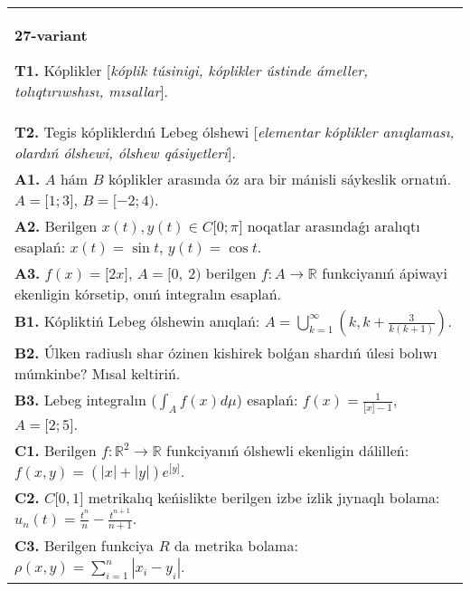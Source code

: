 \documentclass{article}
\begin{document}
\begin{tabular}{m{17cm}}
\textbf{27-variant}
\newline

\textbf{T1.} Kóplikler [\textit{kóplik túsinigi, kóplikler ústinde ámeller, tolıqtırıwshısı, mısallar}]. \\
\textbf{T2.} Tegis kópliklerdıń Lebeg ólshewi [\textit{elementar kóplikler anıqlaması, olardıń ólshewi, ólshew qásiyetleri}]. \\
\textbf{A1.} \(A\) hám \(B\) kóplikler arasında óz ara bir mánisli sáykeslik ornatıń. \(A = \lbrack 1;3\rbrack\), \(B = \lbrack - 2;4)\). \\
\textbf{A2.} Berilgen \(x(t),y(t) \in C\lbrack 0;\pi\rbrack\) noqatlar arasındaǵı aralıqtı esaplań: \(x(t) = \sin t\), \(y(t) = \cos t\). \\
\textbf{A3.} \(f(x) = \lbrack 2x\rbrack\), \(A = \lbrack 0,\ 2)\) berilgen \(f:A\rightarrow\mathbb{R}\) funkciyanıń ápiwayi ekenligin kórsetip, onıń integralın esaplań. \\
\textbf{B1.} Kópliktiń Lebeg ólshewin anıqlań: \(A = \bigcup_{k = 1}^{\infty}\left( k,k + \frac{3}{k(k + 1)} \right)\). \\
\textbf{B2.} Úlken radiuslı shar ózinen kishirek bolǵan shardıń úlesi bolıwı múmkinbe? Mısal keltiriń. \\
\textbf{B3.} Lebeg integralın (\(\int_{A}^{}{f(x)d\mu}\)) esaplań: \(f(x) = \frac{1}{\lbrack x\rbrack - 1}\), \(A = \lbrack 2;5\rbrack\). \\
\textbf{C1.} Berilgen \(f:\mathbb{R}^{2}\mathbb{\rightarrow R}\) funkciyanıń ólshewli ekenligin dálilleń: \(f(x,y) = \left( |x| + |y| \right)e^{\lbrack y\rbrack}\). \\
\textbf{C2.} \(C\lbrack 0,1\rbrack\) metrikalıq keńislikte berilgen izbe izlik jıynaqlı bolama: \(u_{n}(t) = \frac{t^{n}}{n} - \frac{t^{n + 1}}{n + 1}\). \\
\textbf{C3.} Berilgen funkciya \(R\) da metrika bolama: \(\rho(x,y) = \sum_{i = 1}^{n}\left| x_{i} - y_{i} \right|\). \\

\end{tabular}
\vspace{1cm}
\end{document}

